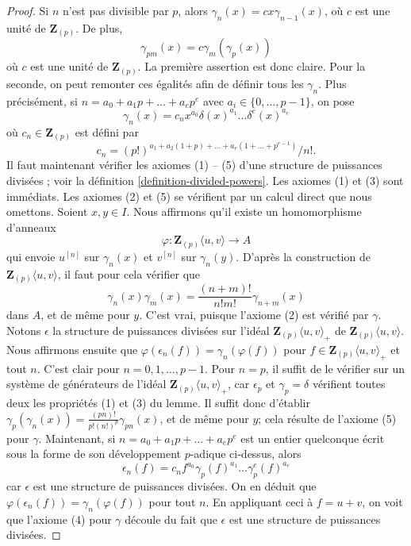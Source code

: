 \begin{proof}
Si $n$ n'est pas divisible par $p$, alors $\gamma_n(x) = c x \gamma_{n - 1}(x)$,
où $c$ est une unité de $\mathbf{Z}_{(p)}$. De plus,
$$
\gamma_{pm}(x) = c \gamma_m(\gamma_p(x))
$$
où $c$ est une unité de $\mathbf{Z}_{(p)}$. La première assertion est donc
claire. Pour la seconde, on peut remonter ces égalités afin de
définir tous les $\gamma_n$. Plus précisément, si
$n = a_0 + a_1p + \ldots + a_e p^e$ avec $a_i \in\{0, \ldots, p - 1\}$,
on pose
$$
\gamma_n(x) = c_n x^{a_0} \delta(x)^{a_1} \ldots\delta^e(x)^{a_e}
$$
où $c_n \in\mathbf{Z}_{(p)}$ est défini par
$$
c_n =
{(p!)^{a_1 + a_2(1 + p) + \ldots + a_e(1 + \ldots + p^{e - 1})}}/{n!}.
$$
Il faut maintenant vérifier les axiomes (1) -- (5) d'une structure de puissances divisées ; voir
la définition \ref{definition-divided-powers}. Les axiomes (1) et (3) sont
immédiats. Les axiomes (2) et (5) se vérifient par un calcul direct que nous
omettons. Soient $x, y \in I$. Nous affirmons qu'il existe un homomorphisme d'anneaux
$$
\varphi : \mathbf{Z}_{(p)}\langle u, v \rangle\longrightarrow A
$$
qui envoie $u^{[n]}$ sur $\gamma_n(x)$ et $v^{[n]}$ sur $\gamma_n(y)$.
D'après la construction de $\mathbf{Z}_{(p)}\langle u, v \rangle$, il faut
pour cela vérifier que
$$
\gamma_n(x)\gamma_m(x) = \frac{(n + m)!}{n!m!} \gamma_{n + m}(x)
$$
dans $A$, et de même pour $y$. C'est vrai, puisque l'axiome (2) est vérifié par $\gamma$.
Notons $\epsilon$ la structure de puissances divisées sur
l'idéal $\mathbf{Z}_{(p)}\langle u, v\rangle_{+}$ de
$\mathbf{Z}_{(p)}\langle u, v\rangle$.
Nous affirmons ensuite que $\varphi(\epsilon_n(f)) = \gamma_n(\varphi(f))$
pour $f \in\mathbf{Z}_{(p)}\langle u, v\rangle_{+}$ et tout $n$.
C'est clair pour $n = 0, 1, \ldots, p - 1$. Pour $n = p$, il suffit
de le vérifier sur un système de générateurs de l'idéal
$\mathbf{Z}_{(p)}\langle u, v\rangle_{+}$, car $\epsilon_p$
et $\gamma_p = \delta$ vérifient toutes deux les propriétés (1) et (3)
du lemme. Il suffit donc d'établir
$\gamma_p(\gamma_n(x)) = \frac{(pn)!}{p!(n!)^p}\gamma_{pn}(x)$,
et de même pour $y$; cela résulte de l'axiome (5) pour $\gamma$.
Maintenant, si $n = a_0 + a_1p + \ldots + a_e p^e$
est un entier quelconque écrit sous la forme de son développement $p$-adique ci-dessus, alors
$$
\epsilon_n(f) =
c_n f^{a_0} \gamma_p(f)^{a_1} \ldots\gamma_p^e(f)^{a_e}
$$
car $\epsilon$ est une structure de puissances divisées. On en déduit que
$\varphi(\epsilon_n(f)) = \gamma_n(\varphi(f))$ pour tout $n$.
En appliquant ceci à $f = u + v$, on voit que l'axiome (4) pour $\gamma$
découle du fait que $\epsilon$ est une structure de puissances divisées.
\end{proof}

